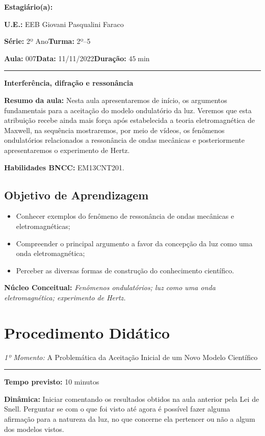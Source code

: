     \noindent \textbf{Estagiário(a): }\imprimirautor 
    
    \noindent \textbf{U.E.: }EEB Giovani Pasqualini Faraco
    
    \noindent \textbf{Série: }2º Ano\hfill{}\textbf{Turma: }2º--5
    
    \noindent \textbf{Aula:} 007\hfill{}\textbf{Data:} 11/11/2022\hfill{}\textbf{Duração:} $45\min$
    \rule{\textwidth}{.5pt}
    \bigskip{}  
    

    \noindent
    \begin{center}
      \textbf{Interferência, difração e ressonância}
    \par\end{center}
    \vspace{20pt}
    \noindent \textbf{Resumo da aula:} Nesta aula apresentaremos de início, os argumentos fundamentais para a aceitação do modelo ondulatório da luz. Veremos que esta atribuição recebe ainda mais força após estabelecida a teoria eletromagnética de Maxwell, na sequência mostraremos, por meio de vídeos, os fenômenos ondulatórios relacionados a ressonância de ondas mecânicas e posteriormente apresentaremos o experimento de Hertz.
    \smallskip
    \par\noindent \textbf{Habilidades BNCC:} EM13CNT201.
    \medskip
    \subsection*{Objetivo de Aprendizagem}
    \begin{itemize}
        \item Conhecer exemplos do fenômeno de ressonância de ondas mecânicas e eletromagnéticas;
        \item Compreender o principal argumento a favor da concepção da luz como uma onda eletromagnética;
        \item Perceber as diversas formas de construção do conhecimento científico.
    \end{itemize}    
    \bigskip{}    
    \noindent \textbf{Núcleo Conceitual:} \emph{Fenômenos ondulatórios; luz como uma onda eletromagnética; experimento de Hertz.}
    \newpage
    

    \section*{Procedimento Didático} 
    \noindent\emph{1º Momento:} A Problemática da Aceitação Inicial de um Novo Modelo Científico
    \par\noindent\rule{.3\textwidth}{.5pt}  
    \par\noindent\textbf{Tempo previsto:} 10 minutos
    \smallskip
    \par\noindent\textbf{Dinâmica:} Iniciar comentando os resultados obtidos na aula anterior pela Lei de Snell. Perguntar se com o que foi visto até agora é possível fazer alguma afirmação para a natureza da luz, no que concerne ela pertencer ou não a algum dos modelos vistos.
    
